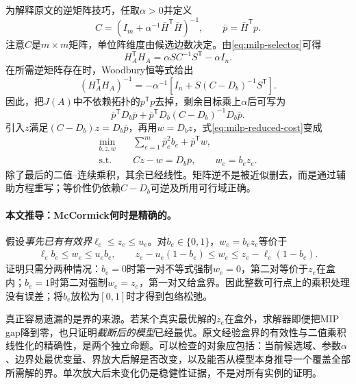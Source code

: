 为解释原文的逆矩阵技巧，任取$\alpha>0$并定义
\begin{equation}
 C=(I_m+\alpha^{-1}\bar H^{\mathsf T}\bar H)^{-1},
 \qquad \bar p=\bar H^{\mathsf T}p.
 \label{eq:milp-C}
\end{equation}
注意$C$是$m\times m$矩阵，单位阵维度由候选边数决定。由\eqref{eq:milp-selector}可得
\begin{equation}
 H_A^{\mathsf T}H_A=\alpha SC^{-1}S^{\mathsf T}-\alpha I_n.
 \label{eq:milp-gram}
\end{equation}
在所需逆矩阵存在时，Woodbury恒等式给出
\begin{equation}
 (H_A^{\mathsf T}H_A)^{-1}
 =-\alpha^{-1}\left[I_n+S(C-D_b)^{-1}S^{\mathsf T}\right].
 \label{eq:milp-woodbury}
\end{equation}
因此，把$J(A)$中不依赖拓扑的$p^{\mathsf T}p$去掉，剩余目标乘上$\alpha$后可写为
\begin{equation}
 \bar p^{\mathsf T}D_b\bar p+
 \bar p^{\mathsf T}D_b(C-D_b)^{-1}D_b\bar p.
 \label{eq:milp-reduced-cost}
\end{equation}
引入$z$满足$(C-D_b)z=D_b\bar p$，再用$w=D_bz$，式\eqref{eq:milp-reduced-cost}变成
\begin{align}
 \min_{b,z,w}\quad &\sum_{e=1}^{m}\bar p_e^2b_e+\bar p^{\mathsf T}w,\label{eq:milp-linear-objective}\\
 \text{s.t.}\quad &Cz-w=D_b\bar p,\qquad w_e=b_ez_e.\nonumber
\end{align}
除了最后的二值--连续乘积，其余已经线性。矩阵逆不是被近似删去，而是通过辅助方程重写；等价性仍依赖$C-D_b$可逆及所用可行域正确。

\paragraph{本文推导：McCormick何时是精确的。}
假设\emph{事先已有有效界}$\ell_e\leq z_e\leq u_e$。对$b_e\in\{0,1\}$，$w_e=b_ez_e$等价于
\begin{align}
 \ell_e b_e\leq w_e\leq u_e b_e,\qquad
 z_e-u_e(1-b_e)\leq w_e\leq z_e-\ell_e(1-b_e).
 \label{eq:milp-mccormick}
\end{align}
证明只需分两种情况：$b_e=0$时第一对不等式强制$w_e=0$，第二对等价于$z_e$在盒内；$b_e=1$时第二对强制$w_e=z_e$，第一对又给盒界。因此整数可行点上的乘积处理没有误差；将$b_e$放松为$[0,1]$时才得到包络松弛。

真正容易遗漏的是界的来源。若某个真实最优解的$z_e$在盒外，求解器即便把MIP gap降到零，也只证明\emph{截断后的模型}已经最优。原文经验盒界的有效性与二值乘积线性化的精确性，是两个独立命题。可以检查的对象应包括：当前候选域、参数$\alpha$、边界处最优变量、界放大后解是否改变，以及能否从模型本身推导一个覆盖全部所需解的界。单次放大后未变化仍是稳健性证据，不是对所有实例的证明。

